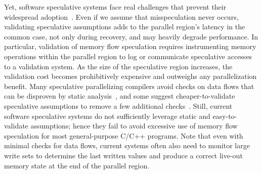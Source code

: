 Yet, software speculative systems face real challenges that prevent their
widespread adoption~\cite{cascaval:08:stmtoy:short, .., ..}.
Even if we assume that misspeculation never occurs, validating speculative
assumptions adds to the parallel region's latency in the common case, not only
during recovery, and may heavily degrade performance.
%
In particular, validation of memory flow speculation requires instrumenting
memory operations within the parallel region to log or communicate speculative
accesses to a validation system. As the size of the speculative region
increases, the validation cost becomes prohibitively expensive and outweighs any
parallelization benefit.
%
Many speculative parallelizing compilers avoid checks on data flows that can be
disproven by static analysis~\cite{stmlite, LRPD,..}, and some suggest
cheaper-to-validate speculative assumptions to remove a few additional
checks~\cite{privateer, ..}.
%
Still, current software speculative systems do not sufficiently leverage static
and easy-to-validate assumptions; hence they fail to avoid excessive use of
memory flow speculation for most general-purpose C/C++ programs.
%
Note that even with minimal checks for data flows, current systems often also
need to monitor large write sets to determine the last written values and
produce a correct live-out memory state at the end of the parallel region.

%
%

